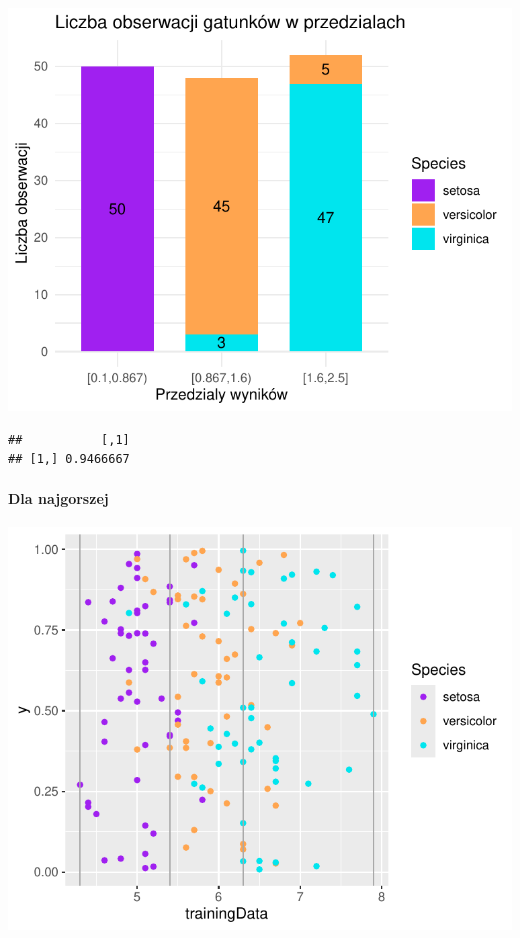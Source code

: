 \documentclass[
  12pt,
]{article}
\begin{document}
\begin{center}\includegraphics{Sprawozdanie2_files/figure-latex/tabela_kondygnacji_1_najl-1} \end{center}

\begin{verbatim}
##           [,1]
## [1,] 0.9466667
\end{verbatim}

\paragraph{Dla najgorszej}\label{dla-najgorszej}

\begin{center}\includegraphics{Sprawozdanie2_files/figure-latex/frequences_najg-1} \end{center}
\end{document}

